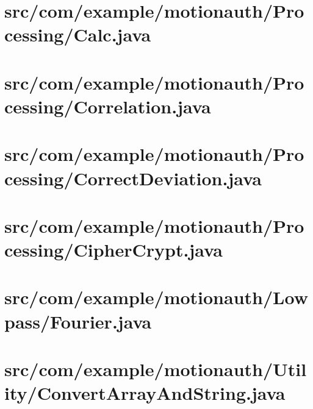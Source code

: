 \documentclass[12pt]{jreport}
\renewcommand{\slash}{/}
\begin{document}
    \section{src\slash com\slash example\slash motionauth\slash Processing\slash Calc.java}
    

    \section{src\slash com\slash example\slash motionauth\slash Processing\slash Correlation.java}
    

    \section{src\slash com\slash example\slash motionauth\slash Processing\slash CorrectDeviation.java}
    

    \section{src\slash com\slash example\slash motionauth\slash Processing\slash CipherCrypt.java}
    

    \section{src\slash com\slash example\slash motionauth\slash Lowpass\slash Fourier.java}
    

    \section{src\slash com\slash example\slash motionauth\slash Utility\slash ConvertArrayAndString.java}
    
\end{document}
